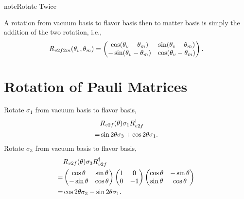 \documentclass[letterpaper,12pt,english]{sphinxmanual}
\begin{document}
\begin{notice}{note}{Rotate Twice}

A rotation from vacuum basis to flavor basis then to matter basis is simply the addition of the two rotation, i.e.,
\begin{gather}
\begin{split}R_{v2f2m}(\theta_v,\theta_m) = \begin{pmatrix} \cos(\theta_v - \theta_m) & \sin ( \theta_v - \theta_m ) \\ -\sin (\theta_v-\theta_m) & \cos (\theta_v - \theta_m) \end{pmatrix}.\end{split}\notag
\end{gather}\end{notice}


\section{Rotation of Pauli Matrices}
\label{basis:rotation-of-pauli-matrices}
Rotate \(\sigma_1\) from vacuum basis to flavor basis,
\begin{gather}
\begin{split}&R_{v2f}(\theta) \sigma_1 R_{v2f}^{\dagger} \\
=& \sin 2\theta \sigma_3 + \cos 2\theta \sigma_1.\end{split}\notag
\end{gather}
Rotate \(\sigma_3\) from vacuum basis to flavor basis,
\begin{gather}
\begin{split}&R_{v2f}(\theta) \sigma_3 R_{v2f}^{\dagger} \\
=&  \begin{pmatrix} \cos \theta & \sin \theta \\ -\sin \theta & \cos\theta \end{pmatrix} \begin{pmatrix} 1 & 0 \\ 0 & -1 \end{pmatrix} \begin{pmatrix} \cos \theta & -\sin \theta \\ \sin \theta & \cos\theta \end{pmatrix} \\
=& \cos 2\theta \sigma_3 - \sin 2\theta \sigma_1.\end{split}\notag
\end{gather}
\end{document}
